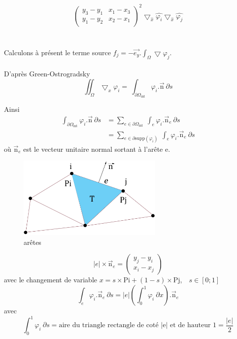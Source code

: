 \documentclass[a4paper,12pt,titlepage]{report}
\begin{document}
\begin{onehalfspace}
\[{\begin{aligned}
\begin{pmatrix}
   		y_{3}-y_{1} &  	x_{1}-x_{3}\\
   		y_{1}-y_{2} &  x_{2}-x_{1}
	\end{pmatrix}
	^{2}
	\bigtriangledown_{\hat{x}} \hat{\varphi_{i}}
	\bigtriangledown_{\hat{x}} \hat{\varphi_{j}}
\end{aligned}}
\]
\\
\\
Calculons à présent le terme source $f_{j} =  -\vec{e_{y}}.\int_{\Omega} \bigtriangledown\varphi_{j}$.
\\
\\
D'après Green-Ostrogradsky
\[
	\iint_{\Omega}\bigtriangledown_{x}{\varphi_{i}} =\ 
	\int_{\partial\Omega_{\text{int}}}\varphi_{i}.\vec{\text{n}} \ \partial s
\]

Ainsi	
\[
	\begin{aligned}
		\int_{\partial\Omega_{\text{int}}}\varphi_{i}.\vec{\text{n}}\ \partial s &= 
		\sum_{e \in \partial\Omega_{\text{int}}}\ \int_{e}\varphi_{i}.\vec{\text{n}}_{e}\ \partial s \\ &=  
		\sum_{e \in \partial\text{supp}(\varphi_{i})}\ \int_{e}\varphi_{i}.\vec{\text{n}}_{e}\ \partial s
	\end{aligned}
\]
où $\vec{\text{n}}_{e}$ est le vecteur unitaire normal sortant à l'arête e. \\
\begin{figure}[h]
\begin{center}
\includegraphics[height = 4cm, keepaspectratio]{graphes/bord.png}
\caption{arêtes}
\label{figure 1}
\end{center}
\end{figure}
\[
	|e|\times \vec{\text{n}}_{e}
	=
	\begin{pmatrix}
		y_{j}-y_{i} \\
		x_{i}-x_{j}
	\end{pmatrix}
\]
avec le changement de variable $x = s\times \text{Pi} + (1-s)\times \text{Pj}$,\ \ $s \in [0;1]$
\[
	\int_{e}\varphi_{i}.\vec{\text{n}}_{e}\ \partial s = |e|(\int_{0}^{1}\varphi_{i}\ \partial x ).\vec{\text{n}}_{e}
\]
avec 
\[
	\int_{0}^{1}\varphi_{i}\ \partial s  = \text{aire du triangle rectangle de coté |e| et de hauteur 1} = \frac{|e|}{2}
\]
\end{onehalfspace}
\end{document}
